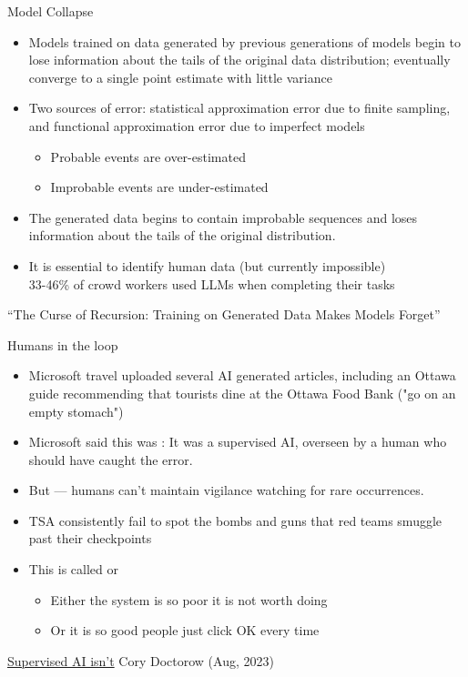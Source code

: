 \begin{frame}{Model Collapse}
\begin{itemize}%
\item Models trained on data generated by previous generations of
  models begin to lose information about the tails of the original
  data distribution;  eventually converge to a single point estimate
  with little variance
\item Two sources of error: statistical
  approximation error due to finite sampling, and functional
  approximation error due to imperfect models
  \begin{itemize}
  \item  Probable events are over-estimated 
  \item Improbable events are under-estimated 
  \end{itemize}
\item The generated data begins to contain improbable sequences and
  loses information about the tails of the original distribution.
\item It is essential to identify human data (but currently impossible)
  \\ 33-46\% of crowd workers used LLMs when completing their tasks
\end{itemize}
\citet{shumailov2023curse} ``The Curse of Recursion: Training on Generated Data Makes Models Forget''

\end{frame}

\begin{frame}{Humans in the loop}

\begin{itemize}
\item Microsoft travel uploaded several AI generated articles,
  including an Ottawa guide recommending that tourists dine
  at the Ottawa Food Bank ("go on an empty stomach")
\item Microsoft said this was : It was a supervised AI, overseen by a human who should have caught the error.
\item But --- humans can't maintain vigilance watching for rare occurrences.
\item TSA consistently fail to spot the bombs and guns that red teams
   smuggle past their checkpoints
 \item This is called  or 
   \begin{itemize}
   \item Either the system is so poor it is not worth doing
   \item Or it is so good people just click OK every time
   \end{itemize}
 \end{itemize}
\href{https://pluralistic.net/2023/08/23/automation-blindness/\#humans-in-the-loop}{Supervised AI isn't} Cory Doctorow (Aug, 2023)

\end{frame}

